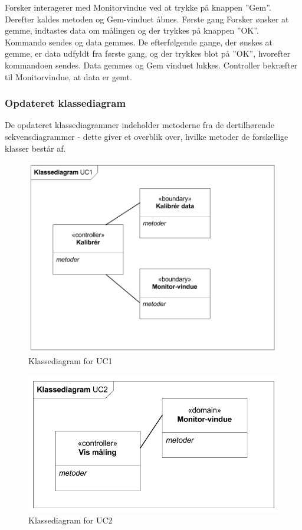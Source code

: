 Forsker interagerer med Monitorvindue ved at trykke på knappen ”Gem”. Derefter kaldes metoden og Gem-vinduet åbnes. Første gang Forsker ønsker at gemme, indtastes data om målingen og der trykkes på knappen ”OK”. Kommando sendes og data gemmes. De efterfølgende gange, der ønskes at gemme, er data udfyldt fra første gang, og der trykkes blot på ”OK”, hvorefter kommandoen sendes. Data gemmes og Gem vinduet lukkes. Controller bekræfter til Monitorvindue, at data er gemt.

\subsubsection{Opdateret klassediagram}
De opdateret klassediagrammer indeholder metoderne fra de dertilhørende  sekvensdiagrammer - dette giver et overblik over, hvilke metoder de forskellige klasser består af.

\begin{figure}[H]
	\centering
	\includegraphics[width=1\textwidth]{Figurer/Snip20151104_37}
	\caption{Klassediagram for UC1}
\end{figure}
 

\begin{figure}[H]
	\centering
	\includegraphics[width=1\textwidth]{Figurer/Snip20151104_38}
	\caption{Klassediagram for UC2}
\end{figure}

